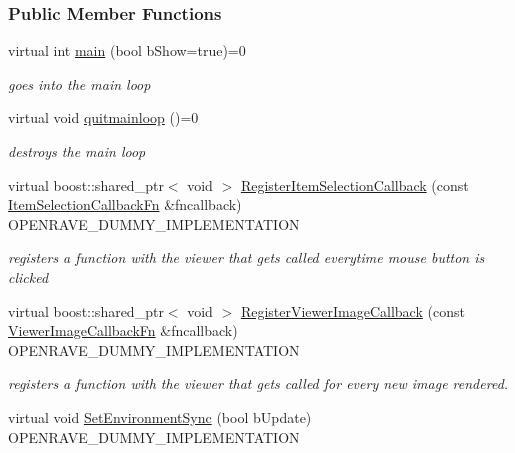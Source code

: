 \subsubsection*{Public Member Functions}
\begin{DoxyCompactItemize}
\item 
virtual int \hyperlink{classOpenRAVE_1_1ViewerBase_ada75ea5cccc17a8cf81b638117139c1c}{main} (bool bShow=true)=0
\begin{DoxyCompactList}\small\item\em goes into the main loop \item\end{DoxyCompactList}\item 
\hypertarget{classOpenRAVE_1_1ViewerBase_ab8fc69e4de743e14207ea400de2f3824}{
virtual void \hyperlink{classOpenRAVE_1_1ViewerBase_ab8fc69e4de743e14207ea400de2f3824}{quitmainloop} ()=0}
\label{classOpenRAVE_1_1ViewerBase_ab8fc69e4de743e14207ea400de2f3824}

\begin{DoxyCompactList}\small\item\em destroys the main loop \item\end{DoxyCompactList}\item 
virtual boost::shared\_\-ptr$<$ void $>$ \hyperlink{classOpenRAVE_1_1ViewerBase_a22844e2b6584a0673cc82cfd7e2fa01d}{RegisterItemSelectionCallback} (const \hyperlink{classOpenRAVE_1_1ViewerBase_aab6d9553843a6d593ee530045d7fff9f}{ItemSelectionCallbackFn} \&fncallback) OPENRAVE\_\-DUMMY\_\-IMPLEMENTATION
\begin{DoxyCompactList}\small\item\em registers a function with the viewer that gets called everytime mouse button is clicked \item\end{DoxyCompactList}\item 
virtual boost::shared\_\-ptr$<$ void $>$ \hyperlink{classOpenRAVE_1_1ViewerBase_ad23099fd4b95a0b7587ec4efe5454043}{RegisterViewerImageCallback} (const \hyperlink{classOpenRAVE_1_1ViewerBase_a33dae9848e343e6740ad259e09e92607}{ViewerImageCallbackFn} \&fncallback) OPENRAVE\_\-DUMMY\_\-IMPLEMENTATION
\begin{DoxyCompactList}\small\item\em registers a function with the viewer that gets called for every new image rendered. \item\end{DoxyCompactList}\item 
\hypertarget{classOpenRAVE_1_1ViewerBase_a3807c4e1bbec9f2d0e9f71cadb7efdd1}{
virtual void \hyperlink{classOpenRAVE_1_1ViewerBase_a3807c4e1bbec9f2d0e9f71cadb7efdd1}{SetEnvironmentSync} (bool bUpdate) OPENRAVE\_\-DUMMY\_\-IMPLEMENTATION}
\label{classOpenRAVE_1_1ViewerBase_a3807c4e1bbec9f2d0e9f71cadb7efdd1}


\end{DoxyCompactItemize}
